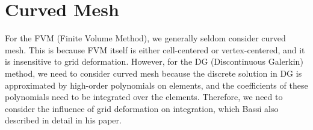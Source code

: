 \documentclass{develop-note}
\begin{document}
\section{Curved Mesh}

For the FVM (Finite Volume Method), we generally seldom consider curved mesh. This is because FVM itself is either cell-centered or vertex-centered, and it is insensitive to grid deformation. However, for the DG (Discontinuous Galerkin) method, we need to consider curved mesh because the discrete solution in DG is approximated by high-order polynomials on elements, and the coefficients of these polynomials need to be integrated over the elements. Therefore, we need to consider the influence of grid deformation on integration, which Bassi also described in detail in his paper\cite{bassiHighOrderAccurateDiscontinuous1997}.
\end{document}
